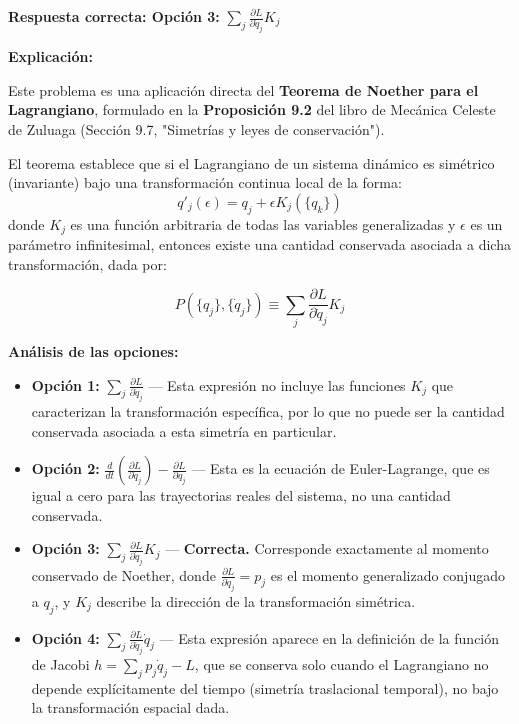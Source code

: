 \documentclass[a4paper]{article}
\begin{document}
\textbf{Respuesta correcta: Opción 3:} $\displaystyle\sum_j \frac{\partial L}{\partial \dot{q}_j} K_j$

\textbf{Explicación:}

Este problema es una aplicación directa del \textbf{Teorema de Noether para el Lagrangiano}, formulado en la \textbf{Proposición 9.2} del libro de Mecánica Celeste de Zuluaga (Sección 9.7, "Simetrías y leyes de conservación").

El teorema establece que si el Lagrangiano de un sistema dinámico es simétrico (invariante) bajo una transformación continua local de la forma:
$$q'_j(\epsilon) = q_j + \epsilon K_j(\{q_k\})$$
donde $K_j$ es una función arbitraria de todas las variables generalizadas y $\epsilon$ es un parámetro infinitesimal, entonces existe una cantidad conservada asociada a dicha transformación, dada por:

$$P(\{q_j\}, \{\dot{q}_j\}) \equiv \sum_j \frac{\partial L}{\partial \dot{q}_j} K_j$$

\textbf{Análisis de las opciones:}

\begin{itemize}
    \item \textbf{Opción 1:} $\displaystyle\sum_j \frac{\partial L}{\partial \dot{q}_j}$ — Esta expresión no incluye las funciones $K_j$ que caracterizan la transformación específica, por lo que no puede ser la cantidad conservada asociada a esta simetría en particular.
    
    \item \textbf{Opción 2:} $\displaystyle\frac{d}{dt}\left(\frac{\partial L}{\partial \dot{q}_j}\right) - \frac{\partial L}{\partial q_j}$ — Esta es la ecuación de Euler-Lagrange, que es igual a cero para las trayectorias reales del sistema, no una cantidad conservada.
    
    \item \textbf{Opción 3:} $\displaystyle\sum_j \frac{\partial L}{\partial \dot{q}_j} K_j$ — \textbf{Correcta.} Corresponde exactamente al momento conservado de Noether, donde $\frac{\partial L}{\partial \dot{q}_j} = p_j$ es el momento generalizado conjugado a $q_j$, y $K_j$ describe la dirección de la transformación simétrica.
    
    \item \textbf{Opción 4:} $\displaystyle\sum_j \frac{\partial L}{\partial \dot{q}_j} \dot{q}_j$ — Esta expresión aparece en la definición de la función de Jacobi $h = \sum_j p_j \dot{q}_j - L$, que se conserva solo cuando el Lagrangiano no depende explícitamente del tiempo (simetría traslacional temporal), no bajo la transformación espacial dada.
\end{itemize}
\end{document}

